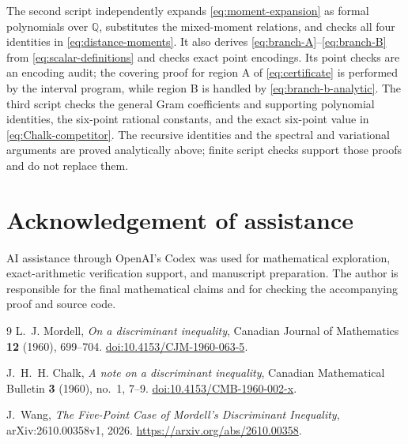 \documentclass[11pt]{article}
\theoremstyle{remark}
\newcommand{\Q}{\mathbb Q}
\numberwithin{equation}{section}
\begin{document}
The second script independently expands \eqref{eq:moment-expansion}
as formal polynomials over $\Q$, substitutes the mixed-moment
relations, and checks all four identities in
\eqref{eq:distance-moments}. It also derives
\eqref{eq:branch-A}--\eqref{eq:branch-B} from
\eqref{eq:scalar-definitions} and checks exact point encodings.
Its point checks are an encoding audit; the covering proof for region A
of \eqref{eq:certificate} is performed by the interval program, while
region B is handled by \eqref{eq:branch-b-analytic}.
The third script checks the general Gram coefficients and supporting
polynomial identities, the six-point rational constants, and the
exact six-point value in \eqref{eq:Chalk-competitor}.
The recursive identities and the spectral and variational arguments
are proved analytically above; finite script checks support those
proofs and do not replace them.

\section*{Acknowledgement of assistance}
AI assistance through OpenAI's Codex was used for mathematical
exploration, exact-arithmetic verification support, and manuscript
preparation. The author is responsible for the final mathematical
claims and for checking the accompanying proof and source code.

\begin{thebibliography}{9}
L.~J. Mordell, \emph{On a discriminant inequality},
Canadian Journal of Mathematics \textbf{12} (1960), 699--704.
\href{https://doi.org/10.4153/CJM-1960-063-5}
{doi:10.4153/CJM-1960-063-5}.


J.~H.~H. Chalk, \emph{A note on a discriminant inequality},
Canadian Mathematical Bulletin \textbf{3} (1960), no.~1, 7--9.
\href{https://doi.org/10.4153/CMB-1960-002-x}
{doi:10.4153/CMB-1960-002-x}.

J.~Wang, \emph{The Five-Point Case of Mordell's Discriminant Inequality},
arXiv:2610.00358v1, 2026.
\url{https://arxiv.org/abs/2610.00358}.
\end{thebibliography}
\end{document}
